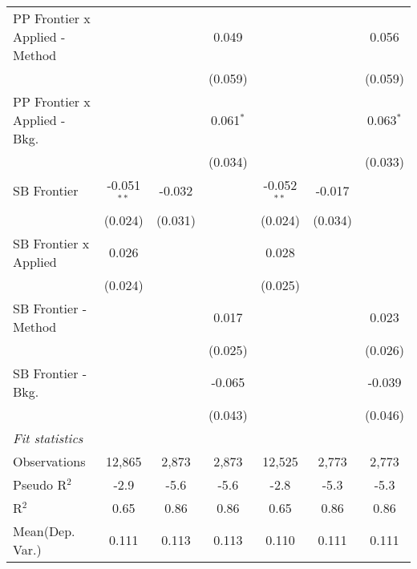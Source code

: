\begin{tabular}{lcccccc}
   PP Frontier x Applied - Method &                &              & 0.049       &                &              & 0.056\\   
                                  &                &              & (0.059)     &                &              & (0.059)\\   
   PP Frontier x Applied - Bkg.   &                &              & 0.061$^{*}$ &                &              & 0.063$^{*}$\\   
                                  &                &              & (0.034)     &                &              & (0.033)\\   
   SB Frontier                    & -0.051$^{**}$  & -0.032       &             & -0.052$^{**}$  & -0.017       &   \\   
                                  & (0.024)        & (0.031)      &             & (0.024)        & (0.034)      &   \\   
   SB Frontier x Applied          & 0.026          &              &             & 0.028          &              &   \\   
                                  & (0.024)        &              &             & (0.025)        &              &   \\   
   SB Frontier - Method           &                &              & 0.017       &                &              & 0.023\\   
                                  &                &              & (0.025)     &                &              & (0.026)\\   
   SB Frontier - Bkg.             &                &              & -0.065      &                &              & -0.039\\   
                                  &                &              & (0.043)     &                &              & (0.046)\\   
   \midrule
   \emph{Fit statistics}\\
   Observations                   & 12,865         & 2,873        & 2,873       & 12,525         & 2,773        & 2,773\\  
   Pseudo R$^2$                   & -2.9           & -5.6         & -5.6        & -2.8           & -5.3         & -5.3\\  
   R$^2$                          & 0.65           & 0.86         & 0.86        & 0.65           & 0.86         & 0.86\\  
Mean(Dep. Var.) & 0.111 & 0.113 & 0.113 & 0.110 & 0.111 & 0.111 \\
   

\end{tabular}
